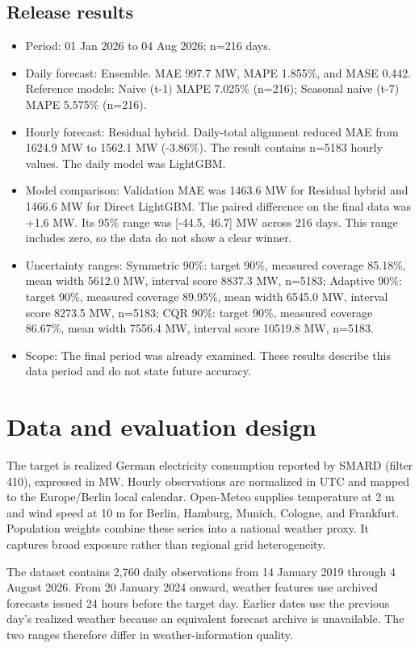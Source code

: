 \documentclass[10.5pt,a4paper]{article}
\begin{document}
\subsection*{Release results}
\begin{itemize}
  \item Period: 01 Jan 2026 to 04 Aug 2026; n=216 days.
  \item Daily forecast: Ensemble. MAE 997.7 MW, MAPE 1.855\%, and MASE 0.442. Reference models: Naive (t-1) MAPE 7.025\% (n=216); Seasonal naive (t-7) MAPE 5.575\% (n=216).
  \item Hourly forecast: Residual hybrid. Daily-total alignment reduced MAE from 1624.9 MW to 1562.1 MW (-3.86\%). The result contains n=5183 hourly values. The daily model was LightGBM.
  \item Model comparison: Validation MAE was 1463.6 MW for Residual hybrid and 1466.6 MW for Direct LightGBM. The paired difference on the final data was +1.6 MW. Its 95\% range was [-44.5, 46.7] MW across 216 days. This range includes zero, so the data do not show a clear winner.
  \item Uncertainty ranges: Symmetric 90\%: target 90\%, measured coverage 85.18\%, mean width 5612.0 MW, interval score 8837.3 MW, n=5183; Adaptive 90\%: target 90\%, measured coverage 89.95\%, mean width 6545.0 MW, interval score 8273.5 MW, n=5183; CQR 90\%: target 90\%, measured coverage 86.67\%, mean width 7556.4 MW, interval score 10519.8 MW, n=5183.
  \item Scope: The final period was already examined. These results describe this data period and do not state future accuracy.
\end{itemize}

\section{Data and evaluation design}

The target is realized German electricity consumption reported by SMARD (filter 410), expressed in
MW. Hourly observations are normalized in UTC and mapped to the Europe/Berlin local calendar.
Open-Meteo supplies temperature at 2 m and wind speed at 10 m for Berlin, Hamburg, Munich, Cologne,
and Frankfurt. Population weights combine these series into a national weather proxy. It captures
broad exposure rather than regional grid heterogeneity.

The dataset contains 2,760 daily observations from 14 January 2019 through 4 August 2026. From 20
January 2024 onward, weather features use archived forecasts issued 24 hours before the target day.
Earlier dates use the previous day's realized weather because an equivalent forecast archive is
unavailable. The two ranges therefore differ in weather-information quality.
\end{document}
